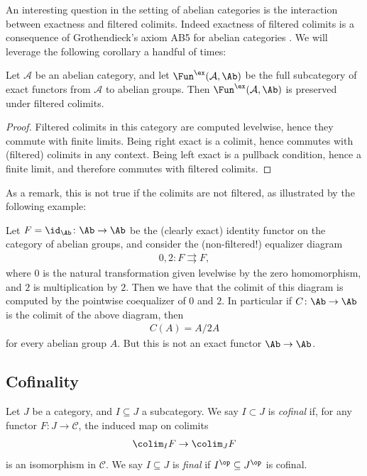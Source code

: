 \documentclass[11pt]{book}
\begin{document}
An interesting question in the setting of abelian categories is the interaction between exactness and filtered colimits. Indeed exactness of filtered colimits is a consequence of Grothendieck's axiom AB5 for abelian categories \cite[1.8.1]{Tohoku}. We will leverage the following corollary a handful of times:

\begin{corollary}\label{cor:filtered-colimits-preserve-exactness} 
Let $\mathcal{A}$ be an abelian category, and let $\Fun^\ex(\mathcal{A},\Ab)$ be the full subcategory of exact functors from $\mathcal{A}$ to abelian groups. Then $\Fun^\ex(\mathcal{A},\Ab)$ is preserved under filtered colimits.
\end{corollary}
\begin{proof} Filtered colimits in this category are computed levelwise, hence they commute with finite limits. Being right exact is a colimit, hence commutes with (filtered) colimits in any context. Being left exact is a pullback condition, hence a finite limit, and therefore commutes with filtered colimits.
\end{proof}

As a remark, this is not true if the colimits are not filtered, as illustrated by the following example:

\begin{example} Let $F = \id_\Ab \colon \Ab \to \Ab$ be the (clearly exact) identity functor on the category of abelian groups, and consider the (non-filtered!) equalizer diagram
\begin{align*}
    0,2 \colon F \rightrightarrows F,
\end{align*}
where $0$ is the natural transformation given levelwise by the zero homomorphism, and $2$ is multiplication by $2$. Then we have that the colimit of this diagram is computed by the pointwise coequalizer of $0$ and $2$. In particular if $C \colon \Ab \to \Ab$ is the colimit of the above diagram, then
\begin{align*}
    C(A) = A/2A
\end{align*}
for every abelian group $A$. But this is not an exact functor $\Ab \to \Ab$.
\end{example}


\subsection{Cofinality}

\begin{definition}\label{def:cofinal} Let $J$ be a category, and $I \subseteq J$ a subcategory. We say $I \subset J$ is \emph{cofinal} if, for any functor $F \colon J \to \mathscr{C}$, the induced map on colimits
\begin{align*}
    \colim_I F \to \colim_J F
\end{align*}
is an isomorphism in $\mathscr{C}$. We say $I \subseteq J$ is \emph{final} if $I^\op \subseteq J^\op$ is cofinal.
\end{definition}
\end{document}
